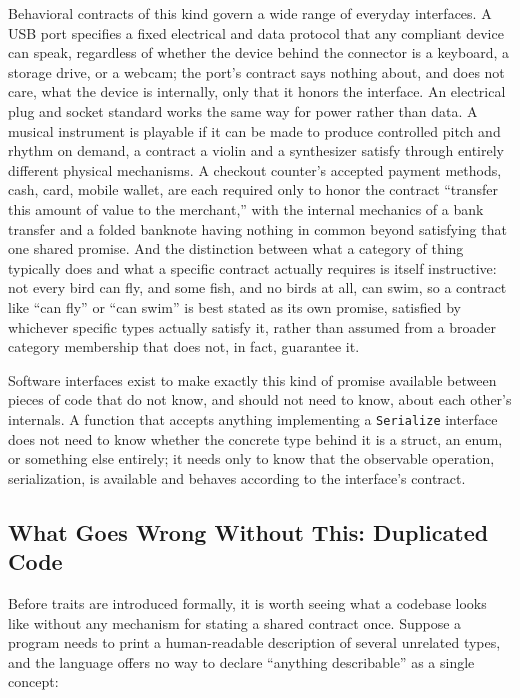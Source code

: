 \documentclass[11pt]{book}
\begin{document}
Behavioral contracts of this kind govern a wide range of everyday interfaces. A USB port specifies a fixed electrical and data protocol that any compliant device can speak, regardless of whether the device behind the connector is a keyboard, a storage drive, or a webcam; the port's contract says nothing about, and does not care, what the device is internally, only that it honors the interface. An electrical plug and socket standard works the same way for power rather than data. A musical instrument is playable if it can be made to produce controlled pitch and rhythm on demand, a contract a violin and a synthesizer satisfy through entirely different physical mechanisms. A checkout counter's accepted payment methods, cash, card, mobile wallet, are each required only to honor the contract ``transfer this amount of value to the merchant,'' with the internal mechanics of a bank transfer and a folded banknote having nothing in common beyond satisfying that one shared promise. And the distinction between what a category of thing typically does and what a specific contract actually requires is itself instructive: not every bird can fly, and some fish, and no birds at all, can swim, so a contract like ``can fly'' or ``can swim'' is best stated as its own promise, satisfied by whichever specific types actually satisfy it, rather than assumed from a broader category membership that does not, in fact, guarantee it.

Software interfaces exist to make exactly this kind of promise available between pieces of code that do not know, and should not need to know, about each other's internals. A function that accepts anything implementing a \texttt{Serialize} interface does not need to know whether the concrete type behind it is a struct, an enum, or something else entirely; it needs only to know that the observable operation, serialization, is available and behaves according to the interface's contract.

\subsection*{What Goes Wrong Without This: Duplicated Code}

Before traits are introduced formally, it is worth seeing what a codebase looks like without any mechanism for stating a shared contract once. Suppose a program needs to print a human-readable description of several unrelated types, and the language offers no way to declare ``anything describable'' as a single concept:
\end{document}
